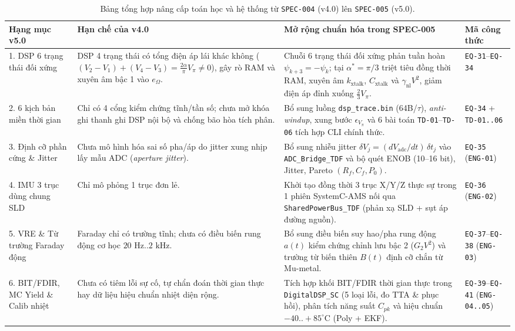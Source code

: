 \documentclass[11pt, a4paper]{article}
\begin{document}
\begin{table}[htbp]
\centering
\caption{Bảng tổng hợp nâng cấp toán học và hệ thống từ \texttt{SPEC-004} (v4.0) lên \texttt{SPEC-005} (v5.0).}
\label{tab:spec005_upgrades}
\footnotesize
\renewcommand{\arraystretch}{1.22}
\begin{tabular}{@{}L{2.8cm} L{4.2cm} L{5.4cm} L{3.1cm}@{}}
\toprule
\textbf{Hạng mục v5.0} & \textbf{Hạn chế của v4.0} & \textbf{Mở rộng chuẩn hóa trong SPEC-005} & \textbf{Mã công thức} \\
. DSP 6 trạng thái đối xứng & DSP 4 trạng thái có tổng điện áp lái khác không ($(V_2-V_1)+(V_4-V_3) = \frac{2\alpha}{\pi}V_\pi \ne 0$), gây rò RAM và xuyên âm bậc 1 vào $e_\Omega$. & Chuỗi 6 trạng thái đối xứng phản tuần hoàn $\psi_{k+3}=-\psi_k$; tại $\alpha^*=\pi/3$ triệt tiêu đồng thời RAM, xuyên âm $k_{\text{xtalk}}$, $C_{\text{xtalk}}$ và $\gamma_{\text{nl}}V^2$, giảm điện áp đỉnh xuống $\frac{2}{3}V_\pi$. & \texttt{EQ-31}--\texttt{EQ-34} \\
2. 6 kịch bản miền thời gian & Chỉ có 4 cổng kiểm chứng tĩnh/tần số; chưa mở khóa ghi thanh ghi DSP nội bộ và chống bão hòa tích phân. & Bổ sung luồng \texttt{dsp\_trace.bin} (64B/$\tau$), \emph{anti-windup}, xung bước $\epsilon_{V_\pi}$ và 6 bài toán \texttt{TD-01}--\texttt{TD-06} tích hợp CLI chính thức. & \texttt{EQ-34} + \texttt{TD-01..06} \\
3. Định cỡ phần cứng \& Jitter & Chưa mô hình hóa sai số pha/áp do jitter xung nhịp lấy mẫu ADC (\emph{aperture jitter}). & Bổ sung nhiễu jitter $\delta V_j = (dV_{\text{adc}}/dt)\,\delta t_j$ vào \texttt{ADC\_Bridge\_TDF} và bộ quét ENOB (10--16 bit), Jitter, Pareto $(R_f, C_f, P_0)$. & \texttt{EQ-35} (\texttt{ENG-01}) \\
4. IMU 3 trục dùng chung SLD & Chỉ mô phỏng 1 trục đơn lẻ. & Khởi tạo đồng thời 3 trục X/Y/Z thực sự trong 1 phiên SystemC-AMS nối qua \texttt{SharedPowerBus\_TDF} (phản xạ SLD + sụt áp đường nguồn). & \texttt{EQ-36} (\texttt{ENG-02}) \\
5. VRE \& Từ trường Faraday động & Faraday chỉ có trường tĩnh; chưa có điều biến rung động cơ học $20\text{ Hz}..2\text{ kHz}$. & Bổ sung điều biến suy hao/pha rung động $a(t)$ kiểm chứng chỉnh lưu bậc 2 ($G_2 V^2$) và trường từ biến thiên $B(t)$ định cỡ chắn từ Mu-metal. & \texttt{EQ-37}--\texttt{EQ-38} (\texttt{ENG-03}) \\
6. BIT/FDIR, MC Yield \& Calib nhiệt & Chưa có tiêm lỗi sự cố, tự chẩn đoán thời gian thực hay dữ liệu hiệu chuẩn nhiệt diện rộng. & Tích hợp khối BIT/FDIR thời gian thực trong \texttt{DigitalDSP\_SC} (5 loại lỗi, đo TTA \& phục hồi), phân tích năng suất $C_{pk}$ và hiệu chuẩn $-40..+85^\circ\text{C}$ (Poly + EKF). & \texttt{EQ-39}--\texttt{EQ-41} (\texttt{ENG-04..05}) \\
\bottomrule
\end{tabular}
\end{table}
\end{document}
